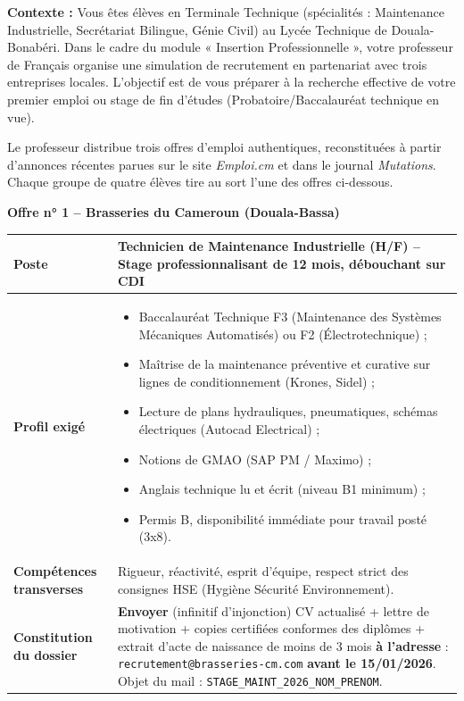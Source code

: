 \documentclass[11pt]{article}
\newcounter{popsec}
\newcounter{popsub}
\newcommand{\courssub}[1]{%
  \stepcounter{popsub}%
  \par\vspace{9pt}\noindent{\popxbold\fontsize{11.5}{13}\selectfont\color{popink}{\color{poporange}\thepopsec.\thepopsub}\hspace{6pt}#1}\par\nopagebreak\vspace{4pt}
}
\begin{document}
\courssub{Situation}
\noindent
\textbf{Contexte :} Vous êtes élèves en Terminale Technique (spécialités : Maintenance Industrielle, Secrétariat Bilingue, Génie Civil) au Lycée Technique de Douala-Bonabéri. Dans le cadre du module « Insertion Professionnelle », votre professeur de Français organise une simulation de recrutement en partenariat avec trois entreprises locales. L'objectif est de vous préparer à la recherche effective de votre premier emploi ou stage de fin d'études (Probatoire/Baccalauréat technique en vue).

\medskip
\noindent
Le professeur distribue trois offres d'emploi authentiques, reconstituées à partir d'annonces récentes parues sur le site \emph{Emploi.cm} et dans le journal \emph{Mutations}. Chaque groupe de quatre élèves tire au sort l'une des offres ci-dessous.

\medskip
\noindent
\textbf{Offre n° 1 -- Brasseries du Cameroun (Douala-Bassa)}
\begin{center}
\begin{tabularx}{\linewidth}{|l|X|}\hline
\textbf{Poste} & Technicien de Maintenance Industrielle (H/F) -- Stage professionnalisant de 12 mois, débouchant sur CDI \\ \hline
\textbf{Profil exigé} & \begin{itemize}\item Baccalauréat Technique F3 (Maintenance des Systèmes Mécaniques Automatisés) ou F2 (Électrotechnique) ;\item Maîtrise de la maintenance préventive et curative sur lignes de conditionnement (Krones, Sidel) ;\item Lecture de plans hydrauliques, pneumatiques, schémas électriques (Autocad Electrical) ;\item Notions de GMAO (SAP PM / Maximo) ;\item Anglais technique lu et écrit (niveau B1 minimum) ;\item Permis B, disponibilité immédiate pour travail posté (3x8).\end{itemize} \\ \hline
\textbf{Compétences transverses} & Rigueur, réactivité, esprit d'équipe, respect strict des consignes HSE (Hygiène Sécurité Environnement). \\ \hline
\textbf{Constitution du dossier} & \textbf{Envoyer} (infinitif d'injonction) CV actualisé + lettre de motivation + copies certifiées conformes des diplômes + extrait d'acte de naissance de moins de 3 mois \textbf{à l'adresse} : \texttt{recrutement@brasseries-cm.com} \textbf{avant le 15/01/2026}. Objet du mail : \texttt{STAGE\_MAINT\_2026\_NOM\_PRENOM}. \\ \hline
\end{tabularx}
\end{center}
\end{document}

